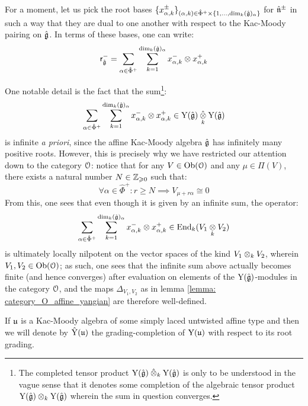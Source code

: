         \begin{remark}
            For a moment, let us pick the root bases $\{ x_{\alpha, k}^{\pm} \}_{(\alpha, k) \in \hat{\Phi}^+ \x \{1, ..., \dim_k (\hat{\g})_{\alpha} \}}$ for $\hat{\mathfrak{n}}^{\pm}$ in such a way that they are dual to one another with respect to the Kac-Moody pairing on $\hat{\mathfrak{g}}$. In terms of these bases, one can write:
                $$\sfr_{\hat{\g}}^- = \sum_{\alpha \in \hat{\Phi}^+} \sum_{k = 1}^{ \dim_k (\hat{\g})_{\alpha} } x_{\alpha, k}^- \tensor x_{\alpha, k}^+$$
        
            One notable detail is the fact that the sum\footnote{The completed tensor product $\rmY(\hat{\g}) \hattensor_k \rmY(\hat{\g})$ is only to be understood in the vague sense that it denotes some completion of the algebraic tensor product $\rmY(\hat{\g}) \tensor_k \rmY(\hat{\g})$ wherein the sum in question converges.}:
                $$\sum_{\alpha \in \hat{\Phi}^+} \sum_{k = 1}^{ \dim_k (\hat{\g})_{\alpha} } x_{\alpha, k}^- \tensor x_{\alpha, k}^+ \in \rmY(\hat{\g}) \hattensor_k \rmY(\hat{\g})$$
            is infinite \textit{a priori}, since the affine Kac-Moody algebra $\hat{\mathfrak{g}}$ has infinitely many positive roots. However, this is precisely why we have restricted our attention down to the category $\mathcal{O}$: notice that for any $V \in \mathrm{Ob}(\mathcal{O})$ and any $\mu \in \Pi(V)$, there exists a natural number $N \in \mathbb{Z}_{\geqslant 0}$ such that:
                $$\forall \alpha \in \hat{\Phi}^+: r \geq N \implies V_{\mu + r \alpha} \cong 0$$
            From this, one sees that even though it is given by an infinite sum, the operator:
                $$\sum_{\alpha \in \hat{\Phi}^+} \sum_{k = 1}^{ \dim_k (\hat{\g})_{\alpha} } x_{\alpha, k}^- \tensor x_{\alpha, k}^+ \in \End_k(V_1 \tensor_k V_2)$$
            is ultimately locally nilpotent on the vector spaces of the kind $V_1 \tensor_k V_2$, wherein $V_1, V_2 \in \mathrm{Ob}(\mathcal{O})$; as such, one sees that the infinite sum above actually becomes finite (and hence converges) after evaluation on elements of the $\mathrm{Y}(\hat{\mathfrak{g}})$-modules in the category $\mathcal{O}$, and the maps $\Delta_{V_1, V_2}$ as in lemma \ref{lemma: category_O_affine_yangian} are therefore well-defined. 
        \end{remark}
        \begin{convention}
            If $\mathfrak{u}$ is a Kac-Moody algebra of some simply laced untwisted affine type and then we will denote by $\hat{\mathrm{Y}}(\mathfrak{u})$ the grading-completion of $\mathrm{Y}(\mathfrak{u})$ with respect to its root grading.
        \end{convention}
